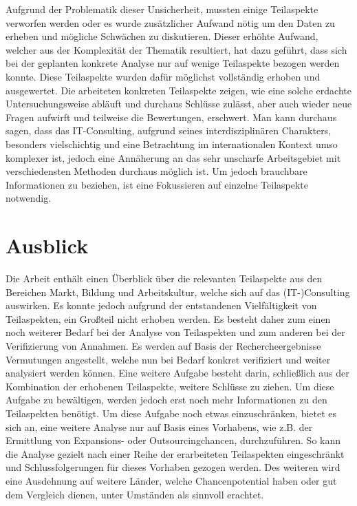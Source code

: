 Aufgrund der Problematik dieser Unsicherheit, mussten einige Teilaspekte verworfen werden oder es wurde zusätzlicher Aufwand nötig um den Daten zu erheben und mögliche Schwächen zu diskutieren. 
Dieser erhöhte Aufwand, welcher aus der Komplexität der Thematik resultiert, hat dazu geführt, dass sich bei der geplanten konkrete Analyse nur auf wenige Teilaspekte bezogen werden konnte. Diese Teilaspekte wurden dafür möglichst vollständig erhoben und ausgewertet. Die arbeiteten konkreten Teilaspekte zeigen, wie eine solche erdachte Untersuchungsweise abläuft und durchaus Schlüsse zulässt, aber auch wieder neue Fragen aufwirft und teilweise die Bewertungen, erschwert.
Man kann durchaus sagen, dass das IT-Consulting, aufgrund seines interdisziplinären Charakters, besonders vielschichtig und eine Betrachtung im internationalen Kontext umso komplexer ist, jedoch eine Annäherung an das sehr unscharfe Arbeitsgebiet mit verschiedensten Methoden durchaus möglich ist. Um jedoch brauchbare Informationen zu beziehen, ist eine Fokussieren auf einzelne Teilaspekte notwendig.
\section{Ausblick}
Die Arbeit enthält einen Überblick über die relevanten Teilaspekte aus den Bereichen Markt, Bildung und Arbeitskultur, welche sich auf das (IT-)Consulting auswirken.
Es konnte jedoch aufgrund der entstandenen Vielfältigkeit von Teilaspekten, ein Großteil nicht erhoben werden. Es besteht daher zum einen noch weiterer Bedarf bei der Analyse von Teilaspekten und zum anderen bei der Verifizierung von Annahmen. Es werden auf Basis der Rechercheergebnisse Vermutungen angestellt, welche nun bei Bedarf konkret verifiziert und weiter analysiert werden können.
Eine weitere Aufgabe besteht darin, schließlich aus der Kombination der erhobenen Teilaspekte, weitere Schlüsse zu ziehen. Um diese Aufgabe zu bewältigen, werden jedoch erst noch mehr Informationen zu den Teilaspekten benötigt.
Um diese Aufgabe noch etwas einzuschränken, bietet es sich an, eine weitere Analyse nur auf Basis eines Vorhabens, wie z.B. der Ermittlung von Expansions- oder Outsourcingchancen, durchzuführen. So kann die Analyse gezielt nach einer Reihe der erarbeiteten Teilaspekten eingeschränkt und Schlussfolgerungen für dieses Vorhaben gezogen werden.
Des weiteren wird eine Ausdehnung auf weitere Länder, welche Chancenpotential haben oder gut dem Vergleich dienen, unter Umständen als sinnvoll erachtet.